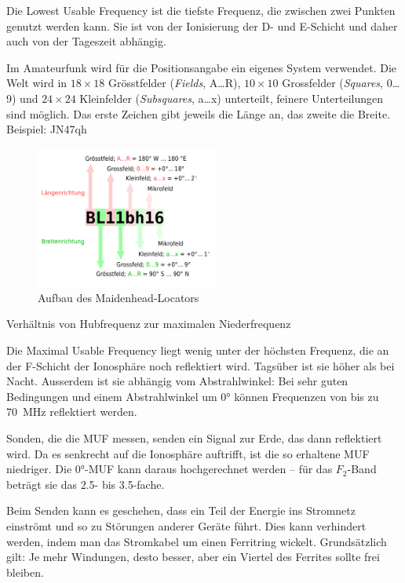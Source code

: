 {}

{Die Lowest Usable Frequency ist die tiefste Frequenz, die zwischen zwei Punkten genutzt werden kann. Sie ist von der Ionisierung der D- und E-Schicht und daher auch von der Tageszeit abhängig.}

{Im Amateurfunk wird für die Positionsangabe ein eigenes System verwendet. Die Welt wird in $18\times 18$ Grösstfelder (\textit{Fields}, A…R), $10\times 10$ Grossfelder (\textit{Squares}, 0…9) und $24\times 24$ Kleinfelder (\textit{Subsquares}, a…x) unterteilt, feinere Unterteilungen sind möglich. Das erste Zeichen gibt jeweils die Länge an, das zweite die Breite. Beispiel: JN47qh

\begin{figure}[h!]
 \centering
 \includegraphics[width=6cm]{./png/Maidenhead_QTH-Locator_erklaert.png}
 \caption{Aufbau des Maidenhead-Locators}
 \label{fig:maidenhead}
\end{figure}

}

{Verhältnis von Hubfrequenz zur maximalen Niederfrequenz}

{Die Maximal Usable Frequency liegt wenig unter der höchsten Frequenz, die an der F-Schicht der Ionosphäre noch reflektiert wird. Tagsüber ist sie höher als bei Nacht. Ausserdem ist sie abhängig vom Abstrahlwinkel: Bei sehr guten Bedingungen und einem Abstrahlwinkel um 0° können Frequenzen von bis zu 70 MHz reflektiert werden.

Sonden, die die MUF messen, senden ein Signal zur Erde, das dann reflektiert wird. Da es senkrecht auf die Ionosphäre auftrifft, ist die so erhaltene MUF niedriger. Die 0°-MUF kann daraus hochgerechnet werden – für das $F_2$-Band beträgt sie das 2.5- bis 3.5-fache.}

{Beim Senden kann es geschehen, dass ein Teil der Energie ins Stromnetz einströmt und so zu Störungen anderer Geräte führt. Dies kann verhindert werden, indem man das Stromkabel um einen Ferritring wickelt. Grundsätzlich gilt: Je mehr Windungen, desto besser, aber ein Viertel des Ferrites sollte frei bleiben.}

